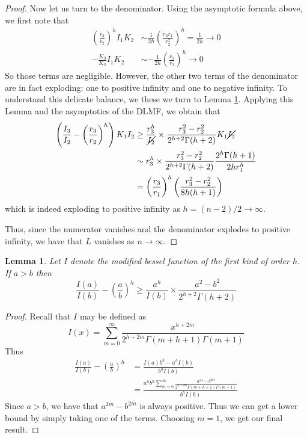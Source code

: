 \documentclass[12pt, nofootinbib,english, amsmath, amssymb, aps, priprint, graphicx,floatfix]{revtex4-1}
\newtheorem{lemma}{Lemma}
\theoremstyle{plain}
\theoremstyle{definition}
\theoremstyle{plain}
\begin{document}
{\begin{proof}
Now let us turn to the denominator.  Using the asymptotic formula above, we first note that
\begin{align*}
\left(\frac{r_{3}}{r_{2}}\right)^{h}I_{1}K_{2}&\sim\frac{1}{2h}\left(\frac{r_{3}r_{1}}{r_{2}^{2}}\right)^{h}=\frac{1}{2h}\rightarrow0\\
-\frac{K_3}{K_{2}}I_{1}K_{2}&\sim-\frac{1}{2h}\left(\frac{r_{1}}{r_{3}}\right)^{h}\rightarrow0
\end{align*}
So those terms are negligible.  However, the other two terms of the denominator are in fact exploding: one to positive infinity and one to negative infinity.  To understand this delicate balance, we these we turn to Lemma \ref{lem:bessel}.  Applying this Lemma and the asymptotics of the DLMF, we obtain that
\begin{align*}\left(\frac{I_{3}}{I_{2}}-\left(\frac{r_{3}}{r_{2}}\right)^{h}\right)K_{1}I_{2}&\geq\frac{r_{3}^{h}}{\cancel{I_{2}}}\times\frac{r_{3}^{2}-r_{2}^{2}}{2^{h+2}\Gamma(h+2)}K_{1}\cancel{I_{2}}\\
&\sim r_{3}^{h}\times\frac{r_{3}^{2}-r_{2}^{2}}{2^{h+2}\Gamma(h+2)}\frac{2^{h}\Gamma(h+1)}{2hr_{1}^{h}}\\&=\left(\frac{r_{3}}{r_{1}}\right)^{h}\left(\frac{r_{3}^{2}-r_{2}^{2}}{8h(h+1)}\right)
\end{align*}
which is indeed exploding to positive infinity as $h=(n-2)/2 \rightarrow \infty$.

Thus, since the numerator vanishes and the denominator explodes to positive infinity, we have that $L$ vanishes as $n\rightarrow \infty$.
\end{proof}

\begin{lemma}\label{lem:bessel}
Let $I$ denote the modified bessel function of the first kind of order $h$.  If $a>b$ then
    \[
    \frac{I ( a)}{I (b)} - \left(\frac{a}{b} \right)^h
    \geq
    \frac{a^h}{I(b)}\times\frac{a^{2} -b^{2}}{2^{h+2}\Gamma(h+2)}
    \]
\end{lemma}
\begin{proof}
Recall that $I$ may be defined as
\[
I(x) = \sum_{m=0}^\infty \frac{x^{h+2m}}{2^{h+2m}\Gamma(m+h+1)\Gamma(m+1)}
\]
Thus
\begin{align*}
\frac{I ( a)}{I (b)} - \left(\frac{a}{b} \right)^h
    &= \frac{I(a)b^h-a^hI(b)}{b^hI(b)}  \\
    &= \frac{a^hb^h\sum_{m=0}^\infty \frac{a^{2m} -b^{2m}}{2^{h+2m}\Gamma(m+h+1)\Gamma(m+1)}}{b^{h}I(b)}
\end{align*}
Since $a>b$, we have that $a^{2m} -b^{2m}$ is always positive.  Thus we can get a lower bound by simply taking one of the terms.  Choosing $m=1$, we get our final result.
\end{proof}

}
\end{document}
